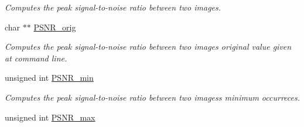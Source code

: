 \begin{DoxyCompactItemize}
\begin{DoxyCompactList}\small\item\em Computes the peak signal-\/to-\/noise ratio between two images. \end{DoxyCompactList}\item 
\hypertarget{structgengetopt__args__info_addbf3118cf05b66c9e090491021c5506}{}char $\ast$$\ast$ \hyperlink{structgengetopt__args__info_addbf3118cf05b66c9e090491021c5506}{P\+S\+N\+R\+\_\+orig}\label{structgengetopt__args__info_addbf3118cf05b66c9e090491021c5506}

\begin{DoxyCompactList}\small\item\em Computes the peak signal-\/to-\/noise ratio between two images original value given at command line. \end{DoxyCompactList}\item 
\hypertarget{structgengetopt__args__info_a6c5fdd0f4896e6347835f965bc8b78a8}{}unsigned int \hyperlink{structgengetopt__args__info_a6c5fdd0f4896e6347835f965bc8b78a8}{P\+S\+N\+R\+\_\+min}\label{structgengetopt__args__info_a6c5fdd0f4896e6347835f965bc8b78a8}

\begin{DoxyCompactList}\small\item\em Computes the peak signal-\/to-\/noise ratio between two images\textquotesingle{}s minimum occurreces. \end{DoxyCompactList}\item 
\hypertarget{structgengetopt__args__info_ad9e910355b5df2aee71b6931ec487063}{}unsigned int \hyperlink{structgengetopt__args__info_ad9e910355b5df2aee71b6931ec487063}{P\+S\+N\+R\+\_\+max}\label{structgengetopt__args__info_ad9e910355b5df2aee71b6931ec487063}


\end{DoxyCompactItemize}
